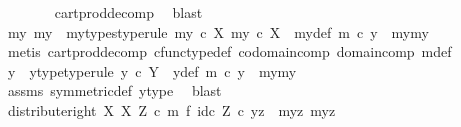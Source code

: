 \begin{isabellebody}
\ \ \ \ \ \ \isamarkupfalse%
\ cart{\isacharunderscore}{\kern0pt}prod{\isacharunderscore}{\kern0pt}decomp\ \isamarkupfalse%
\ blast\isanewline
\ \ \ \ \isamarkupfalse%
\ \isamarkupfalse%
\ my{}\ my{}\ \ my{\isacharunderscore}{\kern0pt}types{\isacharbrackleft}{\kern0pt}type{\isacharunderscore}{\kern0pt}rule{\isacharbrackright}{\kern0pt}{\isacharcolon}{\kern0pt}\ {\isachardoublequoteopen}my{}\ {\isasymin}\isactrlsub c\ X{\isachardoublequoteclose}\ {\isachardoublequoteopen}my{}\ {\isasymin}\isactrlsub c\ X{\isachardoublequoteclose}\ \ my{\isacharunderscore}{\kern0pt}def{\isacharcolon}{\kern0pt}\ {\isachardoublequoteopen}m\ {\isasymcirc}\isactrlsub c\ y\ {\isacharequal}{\kern0pt}\ {\isasymlangle}my{}{\isacharcomma}{\kern0pt}my{}{\isasymrangle}{\isachardoublequoteclose}\isanewline
\ \ \ \ \ \ \isamarkupfalse%
\ {\isacharparenleft}{\kern0pt}metis\ cart{\isacharunderscore}{\kern0pt}prod{\isacharunderscore}{\kern0pt}decomp\ cfunc{\isacharunderscore}{\kern0pt}type{\isacharunderscore}{\kern0pt}def\ codomain{\isacharunderscore}{\kern0pt}comp\ domain{\isacharunderscore}{\kern0pt}comp\ m{\isacharunderscore}{\kern0pt}def{\isacharparenleft}{\kern0pt}{}{\isacharparenright}{\kern0pt}{\isacharparenright}{\kern0pt}\isanewline
\ \ \ \ \isamarkupfalse%
\ \isamarkupfalse%
\ y{\isacharprime}{\kern0pt}\ \ y{\isacharprime}{\kern0pt}{\isacharunderscore}{\kern0pt}type{\isacharbrackleft}{\kern0pt}type{\isacharunderscore}{\kern0pt}rule{\isacharbrackright}{\kern0pt}{\isacharcolon}{\kern0pt}\ {\isachardoublequoteopen}y{\isacharprime}{\kern0pt}\ {\isasymin}\isactrlsub c\ Y{\isachardoublequoteclose}\ \ y{\isacharprime}{\kern0pt}{\isacharunderscore}{\kern0pt}def{\isacharcolon}{\kern0pt}\ {\isachardoublequoteopen}m\ {\isasymcirc}\isactrlsub c\ y{\isacharprime}{\kern0pt}\ {\isacharequal}{\kern0pt}\ {\isasymlangle}my{}{\isacharcomma}{\kern0pt}my{}{\isasymrangle}{\isachardoublequoteclose}\isanewline
\ \ \ \ \ \ \isamarkupfalse%
\ assms\ symmetric{\isacharunderscore}{\kern0pt}def{}\ y{\isacharunderscore}{\kern0pt}type\ \isamarkupfalse%
\ blast\isanewline
\isanewline
\ \ \ \ \isamarkupfalse%
\ {\isachardoublequoteopen}{\isacharparenleft}{\kern0pt}distribute{\isacharunderscore}{\kern0pt}right\ X\ X\ Z\ {\isasymcirc}\isactrlsub c\ {\isacharparenleft}{\kern0pt}m\ {\isasymtimes}\isactrlsub f\ id\isactrlsub c\ Z{\isacharparenright}{\kern0pt}{\isacharparenright}{\kern0pt}\ {\isasymcirc}\isactrlsub c\ yz\ {\isacharequal}{\kern0pt}\ {\isasymlangle}{\isasymlangle}my{}{\isacharcomma}{\kern0pt}z{\isasymrangle}{\isacharcomma}{\kern0pt}\ {\isasymlangle}my{}{\isacharcomma}{\kern0pt}z{\isasymrangle}{\isasymrangle}{\isachardoublequoteclose}\isanewline

\end{isabellebody}
